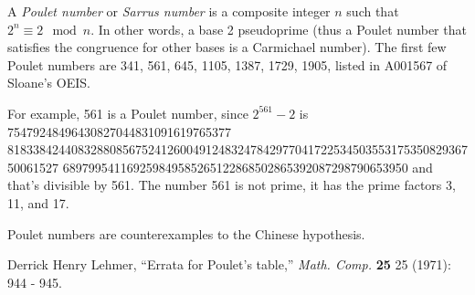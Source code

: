 \documentclass[12pt]{article}
\begin{document}
A {\em Poulet number} or {\em Sarrus number} is a composite integer $n$ such that $2^n \equiv 2 \mod n$. In other words, a base 2 pseudoprime (thus a Poulet number that satisfies the congruence for other bases is a Carmichael number). The first few Poulet numbers are 341, 561, 645, 1105, 1387, 1729, 1905, listed in A001567 of Sloane's OEIS. 

For example, 561 is a Poulet number, since $2^{561} - 2$ is 75479248496430827044831091619765377
81833842440832880856752412600491248324784297704172253450355317535082936750061527
689799541169259849585265122868502865392087298790653950 and that's divisible by 561. The number 561 is not prime, it has the prime factors 3, 11, and 17.

Poulet numbers are counterexamples to the Chinese hypothesis.

\begin{thebibliography}{1}
 Derrick Henry Lehmer, ``Errata for Poulet's table,'' {\it Math. Comp.} {\bf 25} 25 (1971): 944 - 945.
\end{thebibliography}
\end{document}
